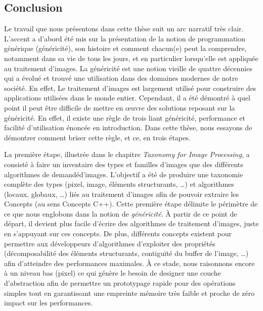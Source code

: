 \subsection*{Conclusion}


Le travail que nous présentons dans cette thèse suit un arc narratif très clair. L'accent a d'abord été mis sur la
présentation de la notion de programmation générique (généricité), son histoire et comment chacun(e) peut la comprendre,
notamment dans sa vie de tous les jours, et en particulier lorsqu'elle est appliquée au traitement d'images. La
généricité est une notion vieille de quattre décennies qui a évolué et trouvé une utilisation dans des domaines modernes
de notre société. En effet, Le traitement d'images est largement utilisé pour construire des applications utilisées dans
le monde entier. Cependant, il a été démontré à quel point il peut être difficile de mettre en \oe{}uvre des solutions
reposant sur la généricité. En effet, il existe une règle de trois liant généricité, performance et facilité
d'utilisation énoncée en introduction. Dans cette thèse, nous essayons de démontrer comment briser cette règle, et ce,
en trois étapes.

La première étape, illustrée dans le chapitre \emph{Taxonomy for Image Processing}, a consisté à faire un inventaire des
types et familles d'images que des différents algorithmes de demandéd'images. L'objectif a été de produire une taxonomie
complète des types (pixel, image, éléments structurants, \ldots) et algorithmes (locaux, globaux, \ldots) liés au
traitement d'images afin de pouvoir extraire les Concepts (au sens Concepts C++). Cette première étape délimite le
périmètre de ce que nous englobons dans la notion de \emph{généricité}. \`{A} partir de ce point de départ, il devient
plus facile d'écrire des algorithmes de traitement d'images, juste en s'appuyant sur ces concepts. De plus, différents
concepts existent pour permettre aux développeurs d'algorithmes d'exploiter des propriétés (décomposabilité des éléments
structurants, contiguïté du buffer de l'image, \ldots) afin d'atteindre des performances maximales. \`{A} ce stade, nous
raisonnons encore à un niveau bas (pixel) ce qui génère le besoin de designer une couche d'abstraction afin de permettre
un prototypage rapide pour des opérations simples tout en garantissant une empreinte mémoire très faible et proche de
zéro impact sur les performances.

